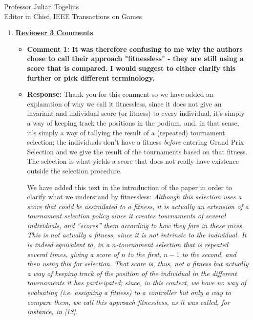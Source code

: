 \documentclass[10pt]{letter} %
\begin{document}
\begin{letter}{Professor Julian Togelius \\ Editor in Chief, IEEE Transactions on Games}
\begin{enumerate}
\begin{itemize}
    \end{itemize}

\newpage

%
\item {\bf \underline{ Reviewer 3 Comments}}\\
	\begin{itemize}
	\item {\bf  Comment 1: It was therefore confusing to me why the authors chose to call their approach "fitnessless" - they are still using a score that is compared. I would suggest to either clarify this further or pick different terminology.}
	\item {\bf Response:} 
	Thank you for this comment so we have added an explanation of why we call it fitnessless, since it does not give an invariant and individual score (or fitness) to every
individual, it's simply a way of keeping track the positions in the
podium, and, in that sense, it's simply a way of tallying the result
of a (repeated) tournament selection; the individuals don't have a
fitness {\em before} entering Grand Prix Selection and we give the
result of the tournaments based on that fitness. The selection is what
yields a score that does not really have existence outside the
selection procedure.

We have added this text in the introduction of the paper in order to clarify what we understand by fitnessless:
{\em Although this selection uses a score that could be assimilated to a fitness, it is actually an extension of a tournament selection policy since it creates tournaments of several individuals, and ``scores'' them according to how they fare in these races. This is not actually a fitness, since it is not intrinsic to the individual. It is indeed equivalent to, in a $n$-tournament selection that is repeated several times, giving a score of $n$ to the first, $n-1$ to the second, and then using this for selection. That score is, thus, not a fitness but actually a way of keeping track of the position of the individual in the different tournaments it has participated; since, in this context, we have no way of evaluating (i.e. assigning a fitness) to a controller but only a way to compare them, we call this approach {\em fitnessless}, as it was called, for instance, in [18].}\\


\end{itemize}
\end{enumerate}
\end{letter}
\end{document}
